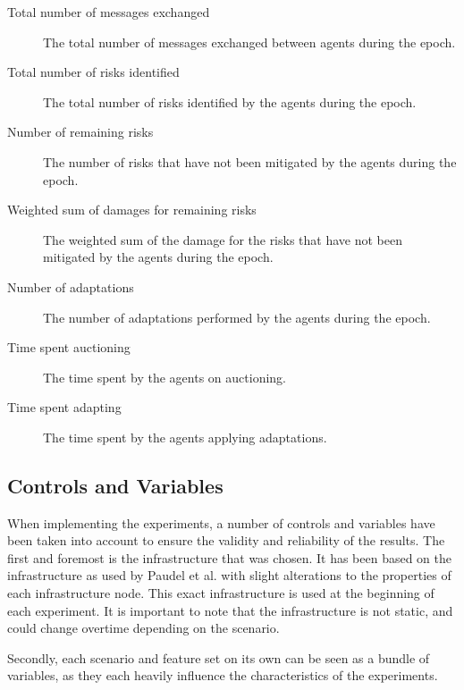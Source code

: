 \begin{description}
    \item[Total number of messages exchanged] The total number of messages exchanged between agents during the epoch.
    \item[Total number of risks identified] The total number of risks identified by the agents during the epoch.
    \item[Number of remaining risks] The number of risks that have not been mitigated by the agents during the epoch.
    \item[Weighted sum of damages for remaining risks] The weighted sum of the damage for the risks that have not been mitigated by the agents during the epoch.
    \item[Number of adaptations] The number of adaptations performed by the agents during the epoch.
    \item[Time spent auctioning] The time spent by the agents on auctioning.
    \item[Time spent adapting] The time spent by the agents applying adaptations.
\end{description}

\subsection{Controls and Variables}
\label{ssec:controls-variables}

When implementing the experiments, a number of controls and variables have been taken into account to ensure the validity and reliability of the results. The first and foremost is the infrastructure that was chosen. It has been based on the infrastructure as used by Paudel et al. \cite{paudel2019detecting} with slight alterations to the properties of each infrastructure node. This exact infrastructure is used at the beginning of each experiment. It is important to note that the infrastructure is not static, and could change overtime depending on the scenario.

Secondly, each scenario and feature set on its own can be seen as a bundle of variables, as they each heavily influence the characteristics of the experiments. 

